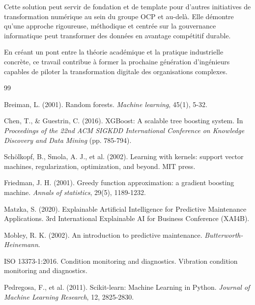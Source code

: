 \documentclass[a4paper,12pt,twoside]{report}
\begin{document}
Cette solution peut servir de fondation et de template pour d'autres initiatives de transformation numérique au sein du groupe OCP et au-delà. Elle démontre qu'une approche rigoureuse, méthodique et centrée sur la gouvernance informatique peut transformer des données en avantage compétitif durable.

En créant un pont entre la théorie académique et la pratique industrielle concrète, ce travail contribue à former la prochaine génération d'ingénieurs capables de piloter la transformation digitale des organisations complexes.

\begin{thebibliography}{99}

 Breiman, L. (2001). Random forests. \textit{Machine learning}, 45(1), 5-32.

 Chen, T., \& Guestrin, C. (2016). XGBoost: A scalable tree boosting system. In \textit{Proceedings of the 22nd ACM SIGKDD International Conference on Knowledge Discovery and Data Mining} (pp. 785-794).

 Schölkopf, B., Smola, A. J., et al. (2002). Learning with kernels: support vector machines, regularization, optimization, and beyond. MIT press.

 Friedman, J. H. (2001). Greedy function approximation: a gradient boosting machine. \textit{Annals of statistics}, 29(5), 1189-1232.

 Matzka, S. (2020). Explainable Artificial Intelligence for Predictive Maintenance Applications. 3rd International Explainable AI for Business Conference (XAI4B).

 Mobley, R. K. (2002). An introduction to predictive maintenance. \textit{Butterworth-Heinemann}.

 ISO 13373-1:2016. Condition monitoring and diagnostics. Vibration condition monitoring and diagnostics.

 Pedregosa, F., et al. (2011). Scikit-learn: Machine Learning in Python. \textit{Journal of Machine Learning Research}, 12, 2825-2830.

\end{thebibliography}
\end{document}
